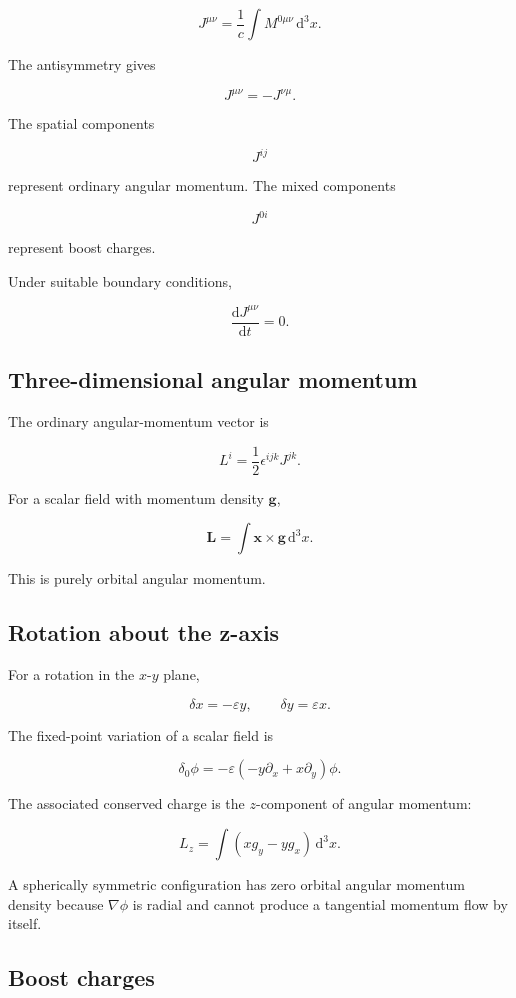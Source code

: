 \[
\boxed{
J^{\mu\nu}
=
\frac{1}{c}
\int
M^{0\mu\nu}
\,\mathrm{d}^{3}x
}.
\]

The antisymmetry gives

\[
J^{\mu\nu}
=
-J^{\nu\mu}.
\]

The spatial components

\[
J^{ij}
\]

represent ordinary angular momentum. The mixed components

\[
J^{0i}
\]

represent boost charges.

Under suitable boundary conditions,

\[
\frac{\mathrm{d}J^{\mu\nu}}{\mathrm{d}t}=0.
\]

\subsection{Three-dimensional angular momentum}

The ordinary angular-momentum vector is

\[
\boxed{
L^{i}
=
\frac{1}{2}
\epsilon^{ijk}
J^{jk}
}.
\]

For a scalar field with momentum density \(\mathbf{g}\),

\[
\boxed{
\mathbf{L}
=
\int
\mathbf{x}\times\mathbf{g}
\,\mathrm{d}^{3}x
}.
\]

This is purely orbital angular momentum.

\subsection{Rotation about the z-axis}

For a rotation in the \(x\)-\(y\) plane,

\[
\delta x
=
-\varepsilon y,
\qquad
\delta y
=
\varepsilon x.
\]

The fixed-point variation of a scalar field is

\[
\boxed{
\delta_0\phi
=
-\varepsilon
\left(
-y\partial_x+x\partial_y
\right)\phi
}.
\]

The associated conserved charge is the \(z\)-component of angular momentum:

\[
L_z
=
\int
\left(
xg_y-yg_x
\right)
\,\mathrm{d}^{3}x.
\]

A spherically symmetric configuration has zero orbital angular momentum density because \(\nabla\phi\) is radial and cannot produce a tangential momentum flow by itself.

\subsection{Boost charges}


